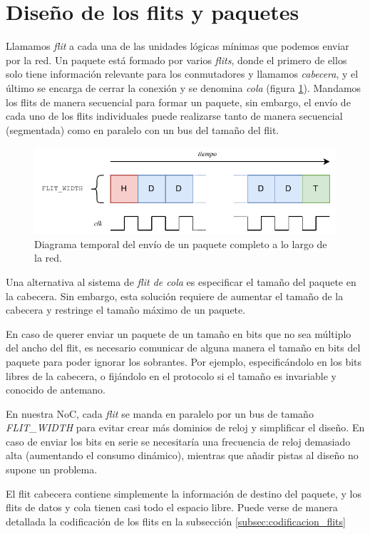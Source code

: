 \section{Diseño de los flits y paquetes}

Llamamos \textit{flit} a cada una de las unidades lógicas mínimas que podemos enviar por la red. Un paquete está formado por varios \textit{flits}, donde el primero de ellos solo tiene información relevante para los conmutadores y llamamos \textit{cabecera}, y el último se encarga de cerrar la conexión y se denomina \textit{cola} (figura \ref{fig:packets}). Mandamos los flits de manera secuencial para formar un paquete, sin embargo, el envío de cada uno de los flits individuales puede realizarse tanto de manera secuencial (segmentada) como en paralelo con un bus del tamaño del flit.

\begin{figure}[h]
    \centering
    \includegraphics{images/diagrams/packets.drawio.pdf}
    \caption{Diagrama temporal del envío de un paquete completo a lo largo de la red.}
    \label{fig:packets}
\end{figure}

Una alternativa al sistema de \textit{flit de cola} es especificar el tamaño del paquete en la cabecera. Sin embargo, esta solución requiere de aumentar el tamaño de la cabecera y restringe el tamaño máximo de un paquete.

En caso de querer enviar un paquete de un tamaño en bits que no sea múltiplo del ancho del flit, es necesario comunicar de alguna manera el tamaño en bits del paquete para poder ignorar los sobrantes. Por ejemplo, especificándolo en los bits libres de la cabecera, o fijándolo en el protocolo si el tamaño es invariable y conocido de antemano.

\begin{recuadronoc}
    En nuestra NoC, cada \textit{flit} se manda en paralelo por un bus de tamaño \textit{FLIT\_WIDTH} para evitar crear más dominios de reloj y simplificar el diseño. En caso de enviar los bits en serie se necesitaría una frecuencia de reloj demasiado alta (aumentando el consumo dinámico), mientras que añadir pistas al diseño no supone un problema.

    El flit cabecera contiene simplemente la información de destino del paquete, y los flits de datos y cola tienen casi todo el espacio libre. Puede verse de manera detallada la codificación de los flits en la subsección \ref{subsec:codificacion_flits}
\end{recuadronoc}
